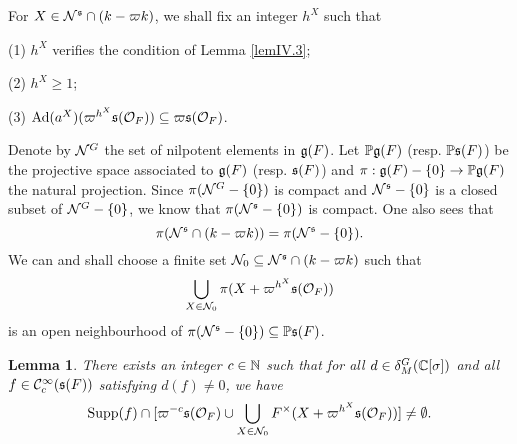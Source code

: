 \documentclass[a4paper]{amsart}
\newtheorem{lem}[thm]{Lemma}
\theoremstyle{definition}
\theoremstyle{remark}
\numberwithin{equation}{subsection}
\begin{document}
For $X\in{\mathcal {N}}^{\mathfrak{s}}\cap(k-\varpi k)$, we shall fix an integer $h^X$ such that

(1) $h^X$ verifies the condition of Lemma \ref{lemIV.3}; 

(2) $h^X\geq 1$; 

(3) ${\mathrm{Ad}}(a^X)(\varpi^{h^X}{\mathfrak{s}}({\mathcal {O}}_F))\subseteq\varpi {\mathfrak{s}}({\mathcal {O}}_F)$. 

Denote by ${\mathcal {N}}^G$ the set of nilpotent elements in ${\mathfrak{g}}(F)$. Let ${\mathbb {P}}{\mathfrak{g}}(F)$ (resp. ${\mathbb {P}}{\mathfrak{s}}(F)$) be the projective space associated to ${\mathfrak{g}}(F)$ (resp. ${\mathfrak{s}}(F)$) and $\pi: {\mathfrak{g}}(F)-\{0\}\rightarrow {\mathbb {P}}{\mathfrak{g}}(F)$ the natural projection. Since $\pi({\mathcal {N}}^G-\{0\})$ is compact and ${\mathcal {N}}^{\mathfrak{s}}-\{0\}$ is a closed subset of ${\mathcal {N}}^G-\{0\}$, we know that $\pi({\mathcal {N}}^{\mathfrak{s}}-\{0\})$ is compact. One also sees that
$$ \pi({\mathcal {N}}^{\mathfrak{s}}\cap(k-\varpi k))=\pi({\mathcal {N}}^{\mathfrak{s}}-\{0\}). $$
We can and shall choose a finite set ${\mathcal {N}}_0\subseteq{\mathcal {N}}^{\mathfrak{s}}\cap(k-\varpi k)$ such that
$$ \bigcup_{X\in{\mathcal {N}}_0} \pi(X+\varpi^{h^X}{\mathfrak{s}}({\mathcal {O}}_F)) $$
is an open neighbourhood of $\pi({\mathcal {N}}^{\mathfrak{s}}-\{0\})\subseteq{\mathbb {P}}{\mathfrak{s}}(F)$. 

\begin{lem}\label{lemIV.4}
There exists an integer $c\in{\mathbb {N}}$ such that for all $d\in\delta_M^G({\mathbb {C}}[\sigma])$ and all $f\in{\mathcal {C}}_c^\infty({\mathfrak{s}}(F))$ satisfying $d(f)\neq 0$, we have
$$ {\mathrm{Supp}}(f)\cap[\varpi^{-c}{\mathfrak{s}}({\mathcal {O}}_F)\cup\bigcup_{X\in{\mathcal {N}}_0} F^\times(X+\varpi^{h^X}{\mathfrak{s}}({\mathcal {O}}_F))]\neq\emptyset. $$
\end{lem}
\end{document}
